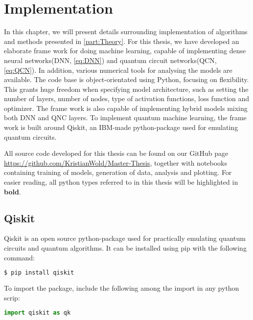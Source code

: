 \chapter{Implementation}\label{chap:implementation}
In this chapter, we will present details surrounding implementation of algorithms and methods presented in \autoref{part:Theory}. For this thesis, we have developed an elaborate frame work for doing machine learning, capable of implementing dense neural networks(DNN, \autoref{eq:DNN}) and quantum circuit networks(QCN, \autoref{eq:QCN}). In addition, various numerical tools for analysing the models are available. The code base is object-orientated using Python, focusing on flexibility. This grants huge freedom when specifying model architecture, such as setting the number of layers, number of nodes, type of activation functions, loss function and optimizer. The frame work is also capable of implementing hybrid models mixing both DNN and QNC layers. To implement quantum machine learning, the frame work is built around Qiskit\cite{Qiskit}, an IBM-made python-package used for emulating quantum circuits. 

All source code developed for this thesis can be found on our GitHub page \url{https://github.com/KristianWold/Master-Thesis}, together with notebooks containing training of models, generation of data, analysis and plotting. For easier reading, all python types referred to in this thesis will be highlighted in \textbf{bold}.

\section{Qiskit}\label{sec:Qiskit}

Qiskit\cite{Qiskit} is an open source python-package used for practically emulating quantum circuits and quantum algorithms. It can be installed using pip with the following command:

\begin{lstlisting}[language=bash]
  $ pip install qiskit
\end{lstlisting}
To import the package, include the following among the import in any python scrip:
\begin{lstlisting}[language=python]
  import qiskit as qk
\end{lstlisting}

